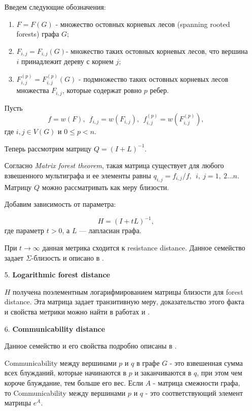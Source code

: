 \begin{itemize}
Введем следующие обозначения: 

\begin{enumerate}
\item $F = F(G)$ - множество остовных корневых лесов (spanning rooted forests) графа $G$; 
\item $F_{i,j} = F_{i,j}(G)$- множество таких остовных корневых лесов, что вершина $i$ принадлежит дереву с корнем $j$; 
\item $F_{i,j}^{(p)} = F_{i,j}^{(p)}(G)$ - подмножество таких остовных корневых лесов множества $F_{i,j}$, которые содержат ровно $p$ ребер.
\end{enumerate}

Пусть 
$$f = w(F),\ \  f_{i,j} = w(F_{i,j}),\ \  f_{i,j}^{(p)} = w(F_{i,j}^{(p)}),$$ 
где $i,j \in V(G)$ и $0 \le p < n$.

Теперь рассмотрим матрицу $Q = (I + L)^{-1}$.

Согласно \emph{Matrix forest theorem}, такая матрица существует для любого взвешенного мультиграфа и ее элементы равны $q_{i,j} = f_{i,j}/f,\ \ i,\ j = 1,\ 2\ldots n$. Матрицу $Q$ можно рассматривать как меру близости. 

Добавим зависимость от параметра:

\begin{equation}
H = (I + tL) ^{-1}, 
\end{equation} 
где параметр $t > 0$, а $L$ --- лапласиан графа.

При $t \rightarrow \infty$ данная метрика сходится к resistance distance. Данное семейство задает $\Sigma$-близость и описано в \cite{chebotarev2011class}.

\item[5.] \textbf{Logarithmic forest distance}

$H$ получена поэлементным логарифмированием матрицы близости для forest distance. Эта матрица задает транзитивную меру, доказательство этого факта и свойства метрики можно найти в работах \cite{chebotarev2011bottleneck} и \cite{chebotarev2011class}.

\item[6.] \textbf{Communicability distance}

Данное семейство и его свойства подробно описаны в \cite{estrada2012communicability}.

Communicability между вершинами $p$ и $q$ в графе $G$ - это взвешенная сумма всех блужданий, которые начинаются в $p$ и заканчиваются в $q$, при этом чем короче блуждание, тем больше его вес. Если $A$ - матрица смежности графа, то Communicability между вершинами $p$ и $q$ - это соответствующий элемент матрицы $e^{A}$. 


\end{itemize}
